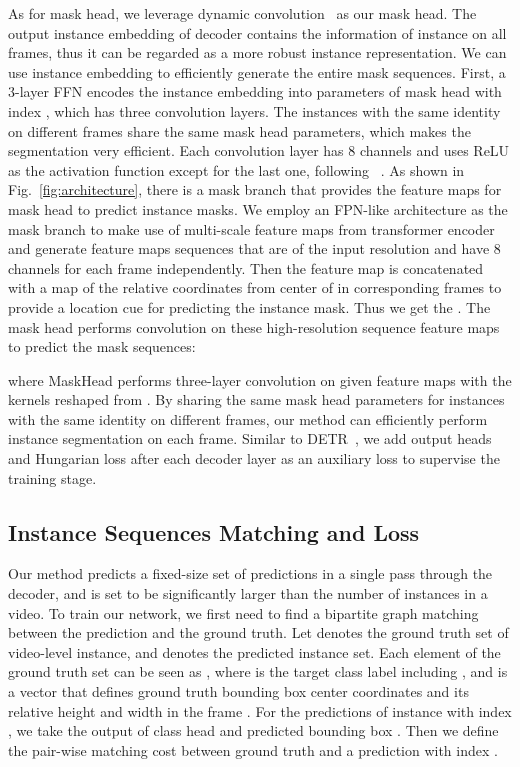 \documentclass[runningheads]{llncs}
\begin{document}
As for mask head, we leverage dynamic convolution~\cite{tian2020conditional} as our mask head. 
The output instance embedding of decoder contains the information of instance on all frames, thus it can be regarded as a more robust instance representation.
We can use instance embedding to efficiently generate the entire mask sequences.
First, a 3-layer FFN encodes the instance embedding into parameters  of mask head with index , which has three  convolution layers. 
The instances with the same identity on different frames share the same mask head parameters, which makes the segmentation very efficient.
Each convolution layer has 8 channels and uses ReLU as the activation function except for the last one, following ~\cite{tian2020conditional}. 
As shown in Fig.~\ref{fig:architecture}, there is a mask branch that provides the feature maps for mask head to predict instance masks. We employ an FPN-like architecture as the mask branch to make use of multi-scale feature maps from transformer encoder and generate feature maps sequences  that are  of the input resolution and have 8 channels for each frame independently. Then the feature map  is concatenated with a map of the relative coordinates from center of  in corresponding frames to provide a location cue for predicting the instance mask.
Thus we get the . 
The mask head performs convolution on these high-resolution sequence feature maps  to predict the mask sequences:

where MaskHead performs three-layer  convolution on given feature maps with the kernels reshaped from .
By sharing the same mask head parameters for instances with the same identity on different frames, our method can efficiently perform instance segmentation on each frame.
Similar to DETR~\cite{detr}, we add output heads and Hungarian loss after each decoder layer as an auxiliary loss to supervise the training stage. 







\subsection{Instance Sequences Matching and Loss}

Our method predicts a fixed-size set of  predictions in a single pass through the decoder, and  is set to be significantly larger than the number of instances in a video. To train our network, we first need to find a bipartite graph matching between the prediction and the ground truth. Let  denotes the ground truth set of video-level instance, and  denotes the predicted instance set. Each element  of the ground truth set can be seen as ,
where  is the target class label including , and  is a vector that defines ground truth bounding box center coordinates and its relative height and width in the frame . For the predictions of instance with index , we take the output of class head   and predicted bounding box . Then we define the pair-wise matching cost between ground truth  and a prediction with index .
\end{document}
